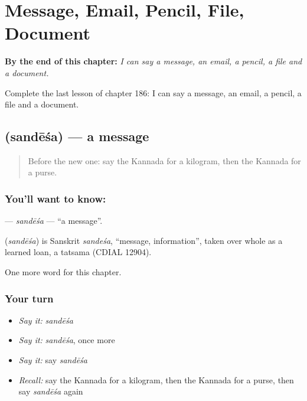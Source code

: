 
\chapter{Message, Email, Pencil, File, Document}
\label{ch:ka-message-email-pencil-file-document}

\begin{chapteropening}
\textbf{By the end of this chapter:} \emph{I can say a message, an email, a pencil, a file and a document.}

Complete the last lesson of chapter 186: I can say a message, an email, a pencil, a file and a document.
\end{chapteropening}

\section[\texorpdfstring{\kn{ಸಂದೇಶ} (sandēśa)}{ಸಂದೇಶ (sandēśa)}]{ (sandēśa) — a message}

\label{lesson:KA-C186-sandesa}



\begin{quote}
Before the new one: say the Kannada for a kilogram, then the Kannada for a purse.
\end{quote}

\subsection*{You'll want to know: }
\textbf{} — \emph{sandēśa} — \textquotedblleft{}a message\textquotedblright{}.

\begin{cousinweb}
\textbf{} (\emph{sandēśa}) is Sanskrit \emph{sandeśa}, \textquotedblleft{}message, information\textquotedblright{}, taken over whole as a learned loan, a tatsama (CDIAL 12904).
\end{cousinweb}

\begin{grammarlens}[title={What you've built}]
One more word for this chapter.
\end{grammarlens}

\subsection*{Your turn}
\begin{itemize}
\raggedright
  \item \emph{Say it:} \emph{sandēśa}
  \item \emph{Say it:} \emph{sandēśa}, once more
  \item \emph{Say it:} say \emph{sandēśa}
  \item \emph{Recall:} say the Kannada for a kilogram, then the Kannada for a purse, then say \emph{sandēśa} again
\end{itemize}

